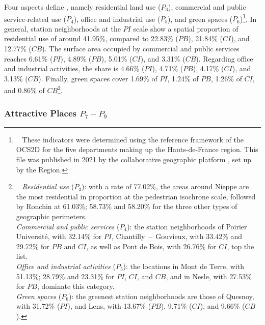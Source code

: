 \begin{refsegment}
Four aspects define , namely residential land use (\(P_{3}\)), commercial and public service-related use (\(P_{4}\)), office and industrial use (\(P_{5}\)), and green spaces (\(P_{6}\))\footnote{~
    These indicators were determined using the reference framework of the \acrfull{OCS2D} for the five departments making up the Hauts-de-France region. This file was published in 2021 by the collaborative geographic platform \textcolor{blue}{\textcite{geo2france_occupation_2021}}, set up by the Region.
}. In general, station neighborhoods at the \(PI\) scale show a spatial proportion of residential use of around 41.95\%, compared to 22.83\% (\(PB\)), 21.84\% (\(CI\)), and 12.77\% (\(CB\)). The surface area occupied by commercial and public services reaches 6.61\% (\(PI\)), 4.89\% (\(PB\)), 5.01\% (\(CI\)), and 3.31\% (\(CB\)). Regarding office and industrial activities, the share is 4.66\% (\(PI\)), 4.71\% (\(PB\)), 4.17\% (\(CI\)), and 3.13\% (\(CB\)). Finally, green spaces cover 1.69\% of \(PI\), 1.24\% of \(PB\), 1.26\% of \(CI\), and 0.86\% of \(CB\)\footnote{~
    \textsl{Residential use} (\(P_{3}\)): with a rate of 77.02\%, the areas around Nieppe are the most residential in proportion at the pedestrian isochrone scale, followed by Ronchin at 61.03\%; 58.73\% and 58.20\% for the three other types of geographic perimeters.
    \\
    \textsl{Commercial and public services} (\(P_{4}\)): the station neighborhoods of Poirier Université, with 32.14\% for \(PI\), Chantilly~–~Gouvieux, with 33.42\% and 29.72\% for \(PB\) and \(CI\), as well as Pont de Bois, with 26.76\% for \(CI\), top the list.
    \\
    \textsl{Office and industrial activities} (\(P_{5}\)): the locations in Mont de Terre, with 51.13\%; 28.79\% and 23.31\% for \(PI\), \(CI\), and \(CB\), and in Nesle, with 27.53\% for \(PB\), dominate this category.
    \\
    \textsl{Green spaces} (\(P_{6}\)): the greenest station neighborhoods are those of Quesnoy, with 31.72\% (\(PI\)), and Lens, with 13.67\% (\(PB\)), 9.71\% (\(CI\)), and 9.66\% (\(CB\)).
}.%

\subsubsection*{Attractive Places \(P_{7} - P_{9}\)
    \label{chap6:indicateurs-place-pois}
    }


\end{refsegment}
